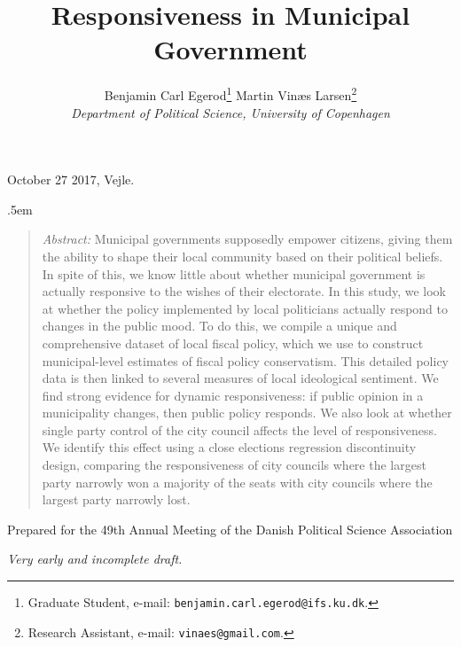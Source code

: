 \documentclass[a4paper,12pt]{article}
\title{\bigskip \bigskip \sffamily \LARGE Responsiveness in Municipal Government}
\author{\bigskip Benjamin Carl Egerod\footnote{Graduate Student, e-mail: \texttt{benjamin.carl.egerod@ifs.ku.dk}.} \qquad Martin Vinæs Larsen\footnote{Research Assistant, e-mail: \texttt{vinaes@gmail.com}.} \\ \textit{Department of Political Science, University of Copenhagen}} %
\makeatletter
\renewcommand{\maketitle}{
	\begin{flushleft}
		
		\onehalfspacing
		
		\@title
		
		\lineskip .5em
		\normalfont{\normalsize{\@author}}
\end{flushleft}}
\makeatother
\begin{document}
	
	\begin{footnotesize} \noindent October 27 2017, Vejle. \end{footnotesize} %
	
	\vspace{0.7in}
	
	\maketitle
	
	\bigskip
	
	\begin{quotation} %

		\small \noindent \emph{Abstract:} Municipal governments supposedly empower citizens, giving them the ability to shape their local community based on their political beliefs. In spite of this, we know little about whether municipal government is actually responsive to the wishes of their electorate. In this study, we look at whether the policy implemented by local politicians actually respond to changes in the public mood. To do this, we compile a unique and comprehensive dataset of local fiscal policy, which we use to construct municipal-level estimates of fiscal policy conservatism. This detailed policy data is then linked to several measures of local ideological sentiment. We find strong evidence for dynamic responsiveness: if public opinion in a municipality changes, then public policy responds. We also look at whether single party control of the city council affects the level of responsiveness. We identify this effect using a close elections regression discontinuity design, comparing the responsiveness of city councils where the largest party narrowly won a majority of the seats with city councils where the largest party narrowly lost.
	\end{quotation}

\bigskip

\bigskip

\bigskip
	
	
	\noindent Prepared for the 49th Annual Meeting of the Danish Political Science Association \newline 
	
	\thispagestyle{empty} %
	
	
	\bigskip
	
		\noindent \textit{Very early and incomplete draft.}
	
	\bigskip
	
	\bigskip
	
\end{document}
